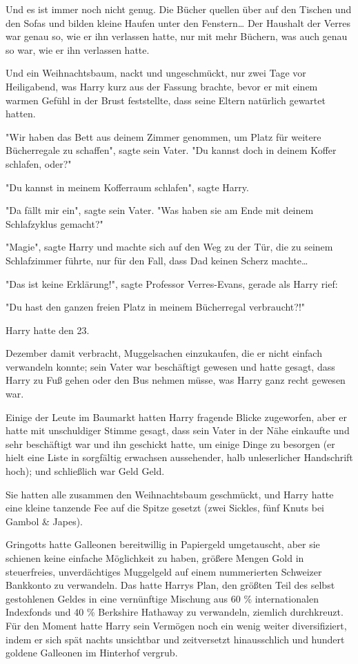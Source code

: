 {Und es ist immer noch nicht genug. Die Bücher quellen über auf den Tischen und den Sofas und bilden kleine Haufen unter den Fenstern… Der Haushalt der Verres war genau so, wie er ihn verlassen hatte, nur mit mehr Büchern, was auch genau so war, wie er ihn verlassen hatte.

Und ein Weihnachtsbaum, nackt und ungeschmückt, nur zwei Tage vor Heiligabend, was Harry kurz aus der Fassung brachte, bevor er mit einem warmen Gefühl in der Brust feststellte, dass seine Eltern natürlich gewartet hatten.

"Wir haben das Bett aus deinem Zimmer genommen, um Platz für weitere Bücherregale zu schaffen", sagte sein Vater. "Du kannst doch in deinem Koffer schlafen, oder?"

"Du kannst in meinem Kofferraum schlafen", sagte Harry.

"Da fällt mir ein", sagte sein Vater. "Was haben sie am Ende mit deinem Schlafzyklus gemacht?"

"Magie", sagte Harry und machte sich auf den Weg zu der Tür, die zu seinem Schlafzimmer führte, nur für den Fall, dass Dad keinen Scherz machte…

"Das ist keine Erklärung!", sagte Professor Verres-Evans, gerade als Harry rief:

"Du hast den ganzen freien Platz in meinem Bücherregal verbraucht?!"

Harry hatte den 23.

Dezember damit verbracht, Muggelsachen einzukaufen, die er nicht einfach verwandeln konnte; sein Vater war beschäftigt gewesen und hatte gesagt, dass Harry zu Fuß gehen oder den Bus nehmen müsse, was Harry ganz recht gewesen war.

Einige der Leute im Baumarkt hatten Harry fragende Blicke zugeworfen, aber er hatte mit unschuldiger Stimme gesagt, dass sein Vater in der Nähe einkaufte und sehr beschäftigt war und ihn geschickt hatte, um einige Dinge zu besorgen (er hielt eine Liste in sorgfältig erwachsen aussehender, halb unleserlicher Handschrift hoch); und schließlich war Geld Geld.

Sie hatten alle zusammen den Weihnachtsbaum geschmückt, und Harry hatte eine kleine tanzende Fee auf die Spitze gesetzt (zwei Sickles, fünf Knuts bei Gambol \& Japes).

Gringotts hatte Galleonen bereitwillig in Papiergeld umgetauscht, aber sie schienen keine einfache Möglichkeit zu haben, größere Mengen Gold in steuerfreies, unverdächtiges Muggelgeld auf einem nummerierten Schweizer Bankkonto zu verwandeln. Das hatte Harrys Plan, den größten Teil des selbst gestohlenen Geldes in eine vernünftige Mischung aus 60 \% internationalen Indexfonds und 40 \% Berkshire Hathaway zu verwandeln, ziemlich durchkreuzt. Für den Moment hatte Harry sein Vermögen noch ein wenig weiter diversifiziert, indem er sich spät nachts unsichtbar und zeitversetzt hinausschlich und hundert goldene Galleonen im Hinterhof vergrub.

}
